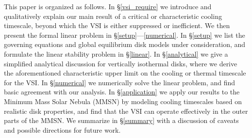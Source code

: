 \documentclass[iop, numberedappendix]{emulateapj}
\begin{document}
This paper is organized as follows. In \S\ref{vsi_require} we 
introduce and qualitatively explain our main result of a critical or
characteristic cooling timescale, beyond which the VSI is either
suppressed or inefficient. We then present the  
formal linear problem in \S\ref{setup}---\ref{numerical}.    
In \S\ref{setup} we list the governing equations and global
equilibrium disk models under consideration, and formulate the linear
stability problem in \S\ref{linear}. In 
\S\ref{analytical} we give a simplified analytical discussion for
vertically isothermal disks, where we derive the aforementioned
characteristic upper limit on the cooling or thermal timescale for the VSI. 
In \S\ref{numerical} we numerically
solve the linear problem, and  
find basic agreement with our analysis.
In 
\S\ref{application} we apply our results to the Minimum Mass
Solar Nebula (MMSN) by modeling cooling timescales based on realistic
disk properties, and find that the VSI can operate effectively in the
outer parts of the MMSN. We summarize in \S\ref{summary} with a
discussion of caveats and possible directions for future work.  
\end{document}
